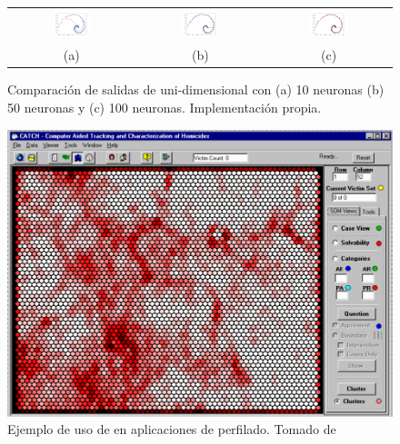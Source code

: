 \begin{figure}[H]
\centering
\begin{tabular}{ccc}
\includegraphics[width=0.32\textwidth]{Figures/som-implementation-example10.pdf} & %
\includegraphics[width=0.32\textwidth]{Figures/som-implementation-example50.pdf} & %
\includegraphics[width=0.32\textwidth]{Figures/som-implementation-example100.pdf} \\
  (a) & (b) & (c) \\ [1em]
\end{tabular}
\decoRule
\caption[Comparación de salidas de  uni-dimensional]{Comparación de salidas de  uni-dimensional con (a) 10 neuronas (b) 50 neuronas y (c) 100 neuronas. Implementación propia.}
\label{fig:som-impl-example-fitting}
\end{figure}

\begin{figure}[H]
\centering
\includegraphics[width=\textwidth]{Figures/som-example.png}
\decoRule
\caption[Ejemplo de uso de  en aplicaciones de perfilado]{Ejemplo de uso de  en aplicaciones de perfilado. Tomado de \cite{mena2003investigative}}
\label{fig:som-example}
\end{figure}

